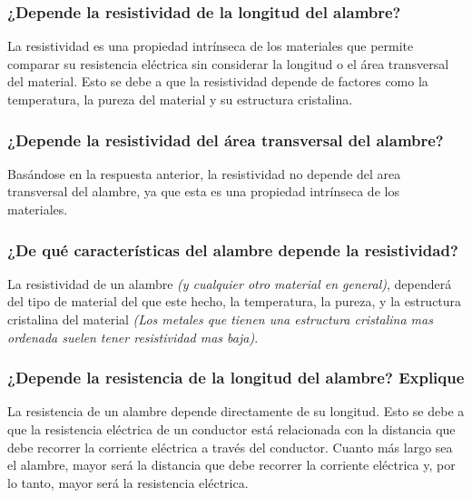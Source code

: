 \documentclass[10pt]{article}
\begin{document}
\begin{multicols}{2}
	\subsubsection*{¿Depende la resistividad de la longitud del alambre?}

	La resistividad es una propiedad intrínseca de los materiales que permite
	comparar su resistencia eléctrica sin considerar la longitud o el área
	transversal del material. Esto se debe a que la resistividad depende de
	factores como la temperatura, la pureza del material y su estructura
	cristalina.~\cite{KhanAcademy}

	\subsubsection*{¿Depende la resistividad del área transversal del alambre?}

	Basándose en la respuesta anterior, la resistividad no depende
	del area transversal del alambre, ya que esta es una propiedad intrínseca
	de los materiales.~\cite{KhanAcademy}


	\subsubsection*{¿De qué características del alambre depende la resistividad?}

	La resistividad de un alambre \textit{(y cualquier otro material en general)},
	dependerá del tipo de material del que este hecho, la temperatura,
	la pureza, y la estructura cristalina del material \textit{(Los metales
		que tienen una estructura cristalina mas ordenada suelen tener
		resistividad mas baja)}.~\cite{KhanAcademy}

	\subsubsection*{¿Depende la resistencia de la longitud del alambre? Explique}

	La resistencia de un alambre depende directamente de su longitud. Esto se
	debe a que la resistencia eléctrica de un conductor está relacionada con
	la distancia que debe recorrer la corriente eléctrica a través del
	conductor. Cuanto más largo sea el alambre, mayor será la distancia que
	debe recorrer la corriente eléctrica y, por lo tanto, mayor será la
	resistencia eléctrica.~\cite{KhanAcademy}


\end{multicols}
\end{document}
